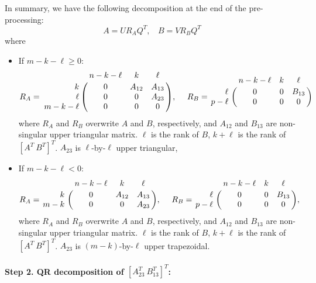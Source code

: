 In summary, we have the following decomposition at the end of the
pre-processing: 
\begin{equation} \label{eq-alg-1}
A = UR_{A}Q^{T},\ \ \ \ B = VR_{B}Q^{T}
\end{equation}
where
\begin{itemize}
\item If $m-k-\ell \geq 0$: 
\[
R_{A} = \bordermatrix{ & n-k-\ell & k & \ell \cr
\hfill k & 0 & A_{12} & A_{13} \cr
\hfill \ell & 0 & 0 & A_{23} \cr
\hfill m-k-\ell & 0 & 0 & 0}, \  \ \ \
R_{B} = \bordermatrix{ & n-k-\ell & k & \ell   \cr
\hfill \ell & 0 & 0 & B_{13}\cr
\hfill p-\ell & 0 & 0 & 0}
\]
where $R_A$ and $R_B$ overwrite $A$ and $B$, respectively, and 
$A_{12}$ and $B_{13}$ are non-singular upper triangular matrix. 
$\ell$ is the rank of $B$, $k+\ell$ is the rank of $[A^T \ B^T]^T$. 
$A_{23}$ is $\ell$-by-$\ell$ upper triangular, 

\item If $m-k-\ell < 0$:
\[
R_{A} = \bordermatrix{ & n-k-\ell & k & \ell \cr
\hfill k & 0 & A_{12} & A_{13} \cr
\hfill m-k & 0 & 0 & A_{23}}, \  \ \ \
R_{B} = \bordermatrix{ & n-k-\ell & k & \ell   \cr
\hfill \ell & 0 & 0 & B_{13}\cr
\hfill p-\ell & 0 & 0 & 0}, 
\]
where $R_A$ and $R_B$ overwrite $A$ and $B$, respectively, and 
$A_{12}$ and $B_{13}$ are non-singular upper triangular matrix. 
$\ell$ is the rank of $B$, $k+\ell$ is the rank of $[A^T \ B^T]^T$. 
$A_{23}$ is $(m-k)$-by-$\ell$ upper trapezoidal. 
\end{itemize}        

\paragraph{Step 2. QR decomposition of $[A_{23}^{T} \ B_{13}^{T}]^T$:} 

